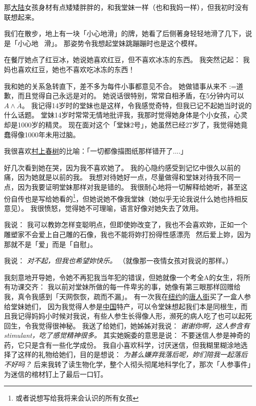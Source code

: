 \documentclass[12pt]{report}
\makeatletter
\newcommand{\cc}[2]{#1}
\newcommand{\cc}[2]{#2}
\newcommand{\speechCn}[1]{\textrm{\textit{\textcolor{Speech}{#1}}}}
\renewcommand{\d}[1]{$\underaccent{\scalebox{0.5}{\textbullet}}{\textrm{#1}}$}
\newcommand{\ds}[1]{%
  \@tfor\next:=#1\do{\d{\next}}}
\makeatother
\begin{document}
{\cc{
那\uline{大陆}女孩身材有点矮矮胖胖的，和我堂妹一样（也和我妈一样），但我初时没有联想起来。
}{
	
}

\cc{
我们在散步，地上有一块「小心地滑」的牌，她看了后侧著身轻轻地滑了几下，说是「小心地 ~滑」。 那姿势令我想起堂妹跳蹦蹦时也是这个模样。
}{
	
}

\cc{
在餐厅她点了红豆冰，她说她喜欢红豆，但不喜欢冰冻的东西。  我突然记起： 我妈也喜欢红豆，她也不喜欢吃冰冻的东西！
}{
	
}

\cc{
我和她的关系急转直下，差不多为每件小事都意见不合。 她做错事从来不\ds{道歉}，而且觉得自己永远是对的。 她说话很特别，常常自相矛盾，在5分钟内可以 $A \wedge \overline{A}$。  我记得14岁时的堂妹也是这样，令我感觉奇特，但我已记不起她当时说的什么话题。  堂妹14岁时常常无情地批评我，我那时觉得她身体是个小女孩，心灵却是1000岁的精灵。  现在面对这个「堂妹2号」，她虽然已经27岁了，我觉得她竟蠢得像1000年未用过脑。%
}{
	
}

\cc{
我很喜欢\uline{村上春树}的比喻：「一切都像描图纸那样错开了....」
}{
	
}

\cc{
好几次看到她在哭，因为我不喜欢她了。  我的心隐约感受到记忆中很久以前的痛，因为她就是以前的我。 我想对待她好一点，尽量做得和堂妹对待我不同一点，因为我要证明堂妹那样对我是错的。 我很耐心地将一切解释给她听，甚至这份自传也是写给她看的\footnote{或者说想写给我将来会认识的所有女孩}，但她说她不像我堂妹（她似乎无论我说什么她也持相反意见）。 我很愤怒，觉得她不可理喻，语言好像对她失去了效用。
}{
	
}

\cc{
我说： 我可以教妳怎样变聪明点，但即使妳改变了，我也不会喜欢妳，正如一个雕塑家不会爱上自己雕的石像，我也不能将妳打扮得性感漂亮 ~然后爱上妳，因为那就不是「爱」而是「自慰」。
}{
	
}

\cc{
我说： \speechCn{对不起，但我也希望妳快乐。} （就像那一夜情女孩对我说的那样。）
}{
	
}

\cc{
我刻意地开导她，令她不再犯我当年犯的错误，但她就像一个考全A的女生，将所有功课交齐： 我以前对堂妹所做的每一件卑劣的事，她像有第三眼那样回赠给我，真令我感到「天网恢恢，疏而不漏」。 有一次我在\uline{纽约}的\uline{唐人街}买了一盒人参给堂妹她们， 因为我觉得人参是\uline{中国}特产，可以令堂妹想起我们本是同根生，而且我记得妈妈小时候对我说，有些人参生长得像人形，濒死的病人吃了也可以起死回生，令我觉得很神秘。 我送了给她们，她姊姊对我说： \speechCn{谢谢你啊，这人参含有 stimulant，吃了感觉精神很多。}  其实她婉委的意思是说： 不要迷信人参是神奇的药，它只是含有一些化学成份。 我自小喜欢科学，讨厌迷信，但我糊里糊涂地选择了这样的礼物给她们，目的是想说： \speechCn{为甚么嫌弃我落后呢，妳们陪我一起落后不好吗？} 后来我转了读生物化学，整个人彻头彻尾地科学化了，那次「人参事件」为迷信的棺材钉上了最后一口钉。
}{
	
}}
\end{document}
